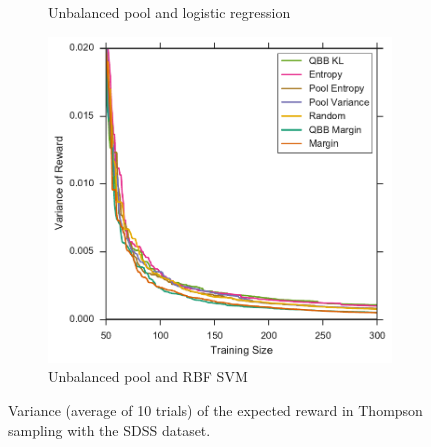 \begin{figure}[p]
\begin{subfigure}{.5\textwidth}
		\caption{Unbalanced pool and logistic regression}
		\label{fig:sdss_ul_sigmas}
	\end{subfigure}%
	\begin{subfigure}{.5\textwidth}
		\centering
		\includegraphics[width=\linewidth]{figures/5_thompson/sdss_ur_sigmas}
		\caption{Unbalanced pool and RBF SVM}
		\label{fig:sdss_ur_sigmas}
	\end{subfigure}
	\caption[Variance of the mean reward of heuristics (SDSS)]{
		Variance (average of 10 trials) of the expected reward in Thompson sampling with the SDSS dataset.}
	\label{fig:sdss_sigmas}
\end{figure}

